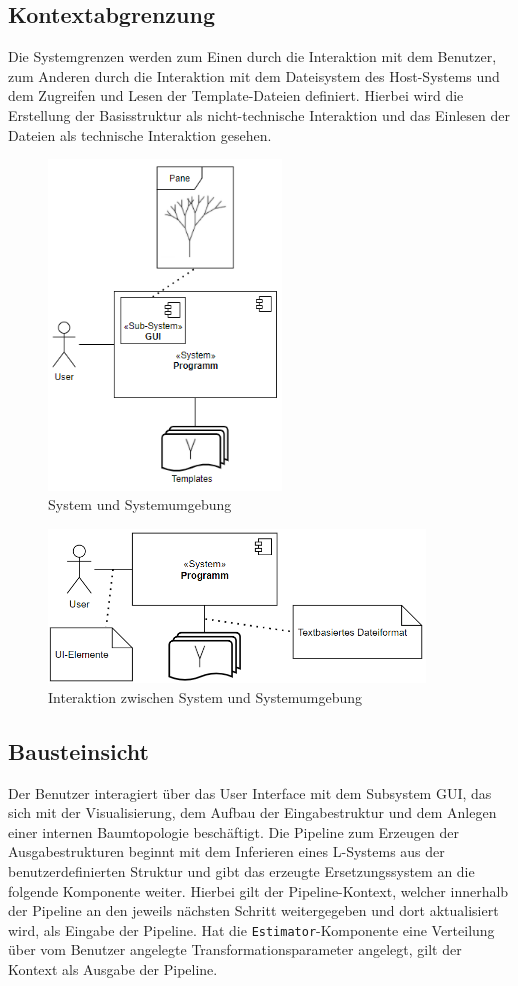 \newpage

\subsection*{Kontextabgrenzung}
Die Systemgrenzen werden zum Einen durch die Interaktion mit dem Benutzer, zum Anderen durch die Interaktion mit
dem Dateisystem des Host-Systems und dem Zugreifen und Lesen der Template-Dateien definiert.
Hierbei wird die Erstellung der Basisstruktur als nicht-technische Interaktion und das Einlesen der Dateien als
technische Interaktion gesehen.
\begin{figure}[H]
    \centering
    \includegraphics[width=6.2cm]{../images/Fachlicher_Kontext.PNG}
    \caption{System und Systemumgebung}
\end{figure}
\begin{figure}[H]
    \centering
    \includegraphics[width=10cm]{../images/Technischer_Kontext.PNG}
    \caption{Interaktion zwischen System und Systemumgebung}
\end{figure}

\subsection*{Bausteinsicht}
Der Benutzer interagiert über das User Interface mit dem Subsystem GUI, das sich mit der Visualisierung, dem Aufbau der
Eingabestruktur und dem Anlegen einer internen Baumtopologie beschäftigt.
Die Pipeline zum Erzeugen der Ausgabestrukturen beginnt mit dem Inferieren eines L-Systems aus der benutzerdefinierten
Struktur und gibt das erzeugte Ersetzungssystem an die folgende Komponente weiter.
Hierbei gilt der Pipeline-Kontext, welcher innerhalb der Pipeline an den jeweils nächsten Schritt weitergegeben und
dort aktualisiert wird, als Eingabe der Pipeline.
Hat die \texttt{Estimator}-Komponente eine Verteilung über vom Benutzer angelegte Transformationsparameter angelegt, gilt
der Kontext als Ausgabe der Pipeline.

